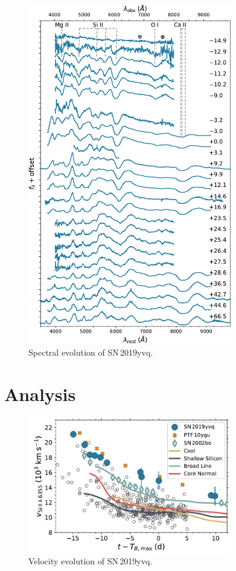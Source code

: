\documentclass[twocolumn]{aastex63}
\newcommand{\sn}{SN\,2019yvq}
\begin{document}
\begin{figure}
    \centering
    \includegraphics[width=3.5in]{./figures/spec_evo.pdf}
    \caption{Spectral evolution of \sn.}
    \label{fig:spec_evo}
\end{figure}

\section{Analysis}\label{sec:analysis}

\begin{figure}
    \centering
    \includegraphics[width=3.5in]{./figures/vel_evolution.pdf}
    \caption{Velocity evolution of \sn.}
    \label{fig:spec_evo}
\end{figure}
\end{document}
